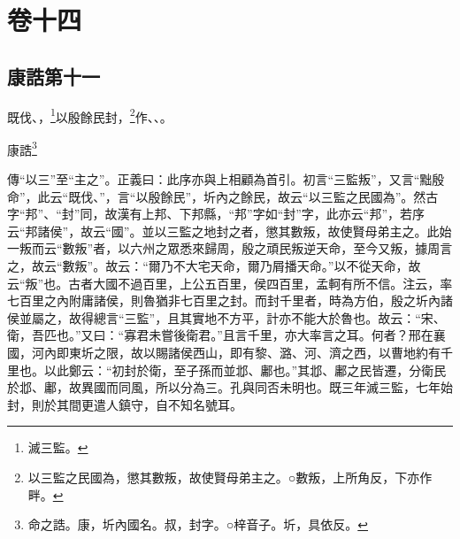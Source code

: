 

\chapter{卷十四}


\section{康誥第十一}


既伐、，\footnote{滅三監。}以殷餘民封，\footnote{以三監之民國為，懲其數叛，故使賢母弟主之。○數叛，上所角反，下亦作畔。}作、、。

康誥\footnote{命之誥。康，圻內國名。叔，封字。○梓音子。圻，具依反。}


{\noindent\zhuan{}\fzbyks 傳“以三”至“主之”。正義曰：此序亦與上相顧為首引。初言“三監叛”，又言“黜殷命”，此云“既伐、”，言“以殷餘民”，圻內之餘民，故云“以三監之民國為”。然古字“邦”、“封”同，故漢有上邦、下邦縣，“邦”字如“封”字，此亦云“邦”，若序云“邦諸侯”，故云“國”。並以三監之地封之者，懲其數叛，故使賢母弟主之。此始一叛而云“數叛”者，以六州之眾悉來歸周，殷之頑民叛逆天命，至今又叛，據周言之，故云“數叛”。故云：“爾乃不大宅天命，爾乃屑播天命。”以不從天命，故云“叛”也。古者大國不過百里，上公五百里，侯四百里，孟軻有所不信。注云，率七百里之內附庸諸侯，則魯猶非七百里之封。而封千里者，時為方伯，殷之圻內諸侯並屬之，故得總言“三監”，且其實地不方平，計亦不能大於魯也。故云：“宋、衛，吾匹也。”又曰：“寡君未嘗後衛君。”且言千里，亦大率言之耳。何者？邢在襄國，河內即東圻之限，故以賜諸侯西山，即有黎、潞、河、濟之西，以曹地約有千里也。以此鄭云：“初封於衛，至子孫而並邶、鄘也。”其邶、鄘之民皆遷，分衛民於邶、鄘，故異國而同風，所以分為三。孔與同否未明也。既三年滅三監，七年始封，則於其間更遣人鎮守，自不知名號耳。 \par}

